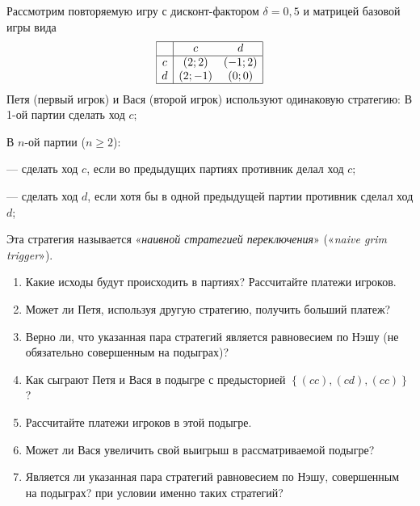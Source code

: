 


\begin{problem}

Рассмотрим повторяемую игру с дисконт-фактором  $\delta =0,5$  и матрицей базовой игры вида
\[\begin{array}{|c|cc|}  \hline {} & {c} & {d} \\  \hline {c} & {(2;2)} & {(-1;2)} \\ {d} & {(2;-1)} & {(0;0)} \\  \hline  \end{array}\]
Петя (первый игрок) и Вася (второй игрок) используют одинаковую стратегию:
В 1-ой партии сделать ход  $c$;\par
В  $n$-ой партии ($n\ge 2$):\par
       — сделать ход  $c$, если во  предыдущих партиях противник делал ход  $c$;\par
       — сделать ход  $d$, если хотя бы в одной предыдущей партии противник сделал ход  $d$;\par
Эта стратегия называется «{\it наивной стратегией переключения}» («{\it naive grim trigger}»).\par
\begin{enumerate}
\item Какие исходы будут происходить в партиях? Рассчитайте платежи игроков.\par
\item Может ли Петя, используя другую стратегию, получить больший платеж?\par
\item  Верно ли, что указанная пара стратегий является равновесием по Нэшу (не обязательно совершенным на подыграх)?\par
\item Как сыграют Петя и Вася в подыгре с предысторией  $\left\{\left(cc\right),\left(cd\right),\left(cc\right)\right\}$?\par
\item Рассчитайте платежи игроков в этой подыгре.\par
\item Может ли Вася увеличить свой выигрыш в рассматриваемой подыгре?\par
\item Является ли указанная пара стратегий равновесием по Нэшу, совершенным на подыграх? {\red при условии именно таких стратегий?}
\end{enumerate}


\begin{sol}

\end{sol}
\end{problem}



